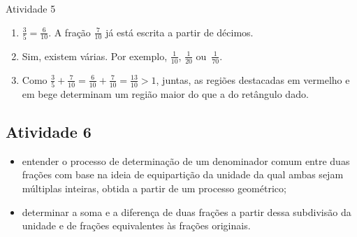\begin{multicols}{2}
\begin{resposta*}{Atividade 5}
\begin{enumerate} [\quad a)]
    \begin{center}
\end{center}

    \item             $\frac{3}{5} = \frac{6}{10}$. A fração       $\frac{7}{10}$       já está escrita a partir de décimos.
    \item       Sim, existem várias. Por exemplo,       $\frac{1}{10}$,       $\frac{1}{20}$       ou~$\frac{1}{70}$.
    \item       Como       $\frac{3}{5}+\frac{7}{10} = \frac{6}{10} + \frac{7}{10} = \frac{13}{10} > 1$, juntas, as regiões destacadas em vermelho e em bege determinam um região maior do que a do retângulo dado.
\end{enumerate} %


\end{resposta*}

\subsection{Atividade 6}

\newline \vspace{.15cm}

\begin{itemize} %
 \item  entender o processo de determinação de um denominador comum entre duas frações com base na ideia de equipartição da unidade da qual ambas sejam múltiplas inteiras, obtida a partir de um processo geométrico;
  \item      determinar a soma e a diferença de duas frações a partir dessa subdivisão da unidade e de frações equivalentes às frações originais.
\end{itemize} %



\end{multicols}
